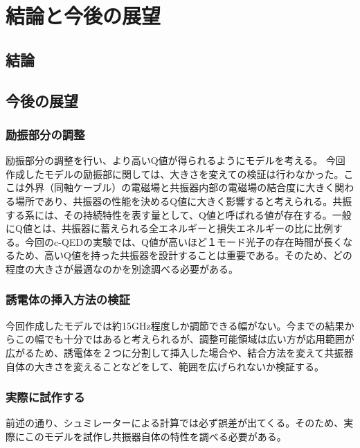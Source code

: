 \chapter{結論と今後の展望}
\section{結論}
\section{今後の展望}

\subsection{励振部分の調整}
励振部分の調整を行い、より高いQ値が得られるようにモデルを考える。
今回作成したモデルの励振部に関しては、大きさを変えての検証は行わなかった。ここは外界（同軸ケーブル）の電磁場と共振器内部の電磁場の結合度に大きく関わる場所であり、共振器の性能を決めるQ値に大きく影響すると考えられる。共振する系には、その持続特性を表す量として、Q値と呼ばれる値が存在する。一般にQ値とは、共振器に蓄えられる全エネルギーと損失エネルギーの比に比例する。今回のc-QEDの実験では、Q値が高いほど１モード光子の存在時間が長くなるため、高いQ値を持った共振器を設計することは重要である。そのため、どの程度の大きさが最適なのかを別途調べる必要がある。

\subsection{誘電体の挿入方法の検証}
今回作成したモデルでは約15GHz程度しか調節できる幅がない。今までの結果からこの幅でも十分ではあると考えられるが、調整可能領域は広い方が応用範囲が広がるため、誘電体を２つに分割して挿入した場合や、結合方法を変えて共振器自体の大きさを変えることなどをして、範囲を広げられないか検証する。

\subsection{実際に試作する}
前述の通り、シュミレーターによる計算では必ず誤差が出てくる。そのため、実際にこのモデルを試作し共振器自体の特性を調べる必要がある。
